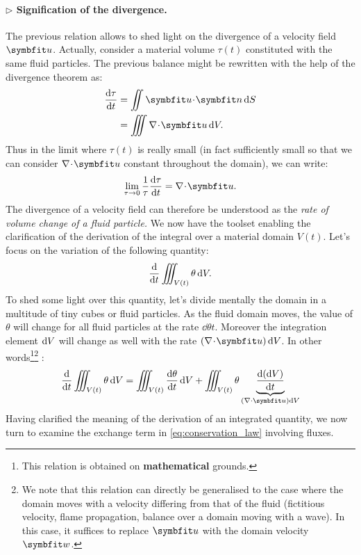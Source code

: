 \paragraph{$\rhd$ Signification of the divergence.} The previous relation allows to shed light on the divergence of a velocity field~$\bu$. Actually, consider a material volume $\tau(t)$ constituted with the same fluid particles. The previous balance might be rewritten with the help of the divergence theorem as:
\begin{align}
\dd{\tau}{t} &= \iint \bu \!\cdot\! \bn \, \dS\\
		&= \iiint \nabla \!\cdot\! \bu \, \dV.
\end{align}
Thus in the limit where $\tau(t)$ is really small (in fact sufficiently small so that we can consider  $\nabla \!\cdot\! \bu$ constant throughout the domain), we can write:
\begin{equation}
\lim_{\tau \to 0} \frac{1}{\tau} \dd{\tau}{t} = \nabla \!\cdot\! \bu.
\end{equation}
The divergence of a velocity field can therefore be understood as the \textit{rate of volume change of a fluid particle.}
 We now have the toolset enabling the clarification of the derivation of the integral over a material domain $V(t)$. Let's focus on the variation of the following quantity:
$$
\frac{\mathrm d }{\mathrm d t} \iiint_{V(t)} \theta \,\mathrm dV.
$$
To shed some light over this quantity, let's divide mentally the domain in a multitude of tiny cubes or fluid particles.
As the fluid domain moves, the value of $\theta$ will change for all fluid particles at the rate $\dd{\theta}{t}$. Moreover the integration element $\mathrm dV$ will change as well with the rate $\lp\nabla\!\cdot\!\bu\rp\mathrm dV$. In other words\footnote{This relation is obtained on \textbf{mathematical} grounds.}\footnote{We note that this relation can directly be generalised to the case where the domain moves with a velocity differing from that of the fluid (fictitious velocity, flame propagation, balance over a domain moving with a wave). In this case, it suffices to replace $\bu$ with the domain velocity $\bw$.}  :
\begin{equation}
\dd{}{t} \iiint_{V(t)} \theta \,\dV = \iiint_{V(t)} \dd{\theta}{t} \,\dV + \iiint_{V(t)} \theta \underbrace{\dd{(\dV)}{t}}_{\lp\nabla \cdot \bu\rp\dV}
\end{equation}
Having clarified the meaning of the derivation of an integrated quantity, we now turn to examine the exchange term in \eqref{eq:conservation_law} involving fluxes.
